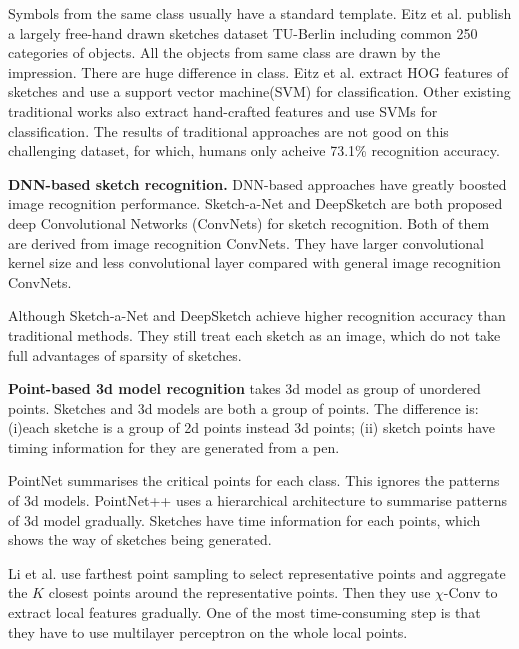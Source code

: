 Symbols from the same class usually have a standard template. Eitz et al. \cite{Eitz2012HowDH} publish a largely free-hand drawn sketches dataset TU-Berlin including common 250 categories of objects. All the objects from same class are drawn by the impression. There are huge difference in class. Eitz et al. extract HOG features of sketches and use a support vector machine(SVM) for classification. Other existing traditional works \cite{LiHSG15, Schneider2014SketchCA} also extract hand-crafted features and use SVMs for classification. The results of traditional approaches are not good on this challenging dataset, for which, humans only acheive 73.1\% recognition accuracy.

\textbf{DNN-based sketch recognition.} DNN-based approaches have greatly boosted image recognition performance. Sketch-a-Net \cite{Yu2015SketchaNetTB} and DeepSketch \cite{Seddati2015DeepSketchDC} are both proposed deep Convolutional Networks (ConvNets) for sketch recognition. Both of them are derived from image recognition ConvNets. They have larger convolutional kernel size and less convolutional layer compared with general image recognition ConvNets.

Although Sketch-a-Net \cite{Yu2015SketchaNetTB} and DeepSketch \cite{Seddati2015DeepSketchDC} achieve higher recognition accuracy than traditional methods. They still treat each sketch as an image, which do not take full advantages of sparsity of sketches.

\textbf{Point-based 3d model recognition} takes 3d model as group of unordered points. Sketches and 3d models are both a group of points. The difference is: (i)each sketche is a group of 2d points instead 3d points; (ii) sketch points have timing information for they are generated from a pen.

PointNet \cite{qi2017pointnet} summarises the critical points for each class. This ignores the patterns of 3d models. PointNet++ \cite{qi2017pointnetplusplus} uses a hierarchical architecture to summarise patterns of 3d model gradually. Sketches have time information for each points, which shows the way of sketches being generated.

Li et al. \cite{1801.07791} use farthest point sampling to select representative points and  aggregate the $K$ closest points around the representative points. Then they use $\chi$-Conv to extract local features gradually. One of the most time-consuming step is that they have to use multilayer perceptron on the whole local points.

